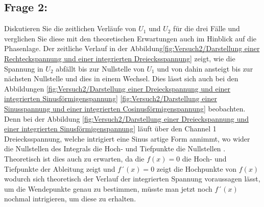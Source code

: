 \subsection{Frage 2:} Diskutieren Sie die zeitlichen Verläufe von $U_1$ und $U_2$ für die drei Fälle und verglichen Sie diese mit den theoretischen Erwartungen auch im Hinblick auf die Phasenlage.
Der zeitliche Verlauf in der Abbildung\ref{fig:Versuch2/Darstellung einer Rechteckspannung und einer integrierten Dreiecksspannung} zeigt, wie die Spannung in $U_2$ abfällt bis zur Nullstelle von $U_1$ und  von dahin ansteigt bis zur nächsten Nullstelle und dies in einem Wechsel. Dies lässt sich auch bei den Abbildungen \ref{fig:Versuch2/Darstellung einer Dreieckspannung und einer integrierten Sinusförmigenspannung} \ref{fig:Versuch2/Darstellung einer Sinusspannung und einer integrierten Cosinusförmigenspannung} beobachten. Denn bei der Abbildung \ref{fig:Versuch2/Darstellung einer Dreieckspannung und einer integrierten Sinusförmigenspannung} läuft über den Channel 1 Dreiecksspannung, welche intrigiert eine Sinus artige Form annimmt, wo wider die Nullstellen des Integrals die Hoch- und Tiefpunkte die Nullstellen  . Theoretisch ist dies auch zu erwarten, da die $f(x)=0$ die Hoch- und Tiefpunkte der Ableitung zeigt und $f´(x)=0$ zeigt die Hochpunkte von $f(x)$ wodurch sich theoretisch der Verlauf der integrierten Spannung voraussagen lässt, um die Wendepunkte genau zu bestimmen, müsste man jetzt noch $f´(x)$ nochmal intrigieren, um diese zu erhalten. 





